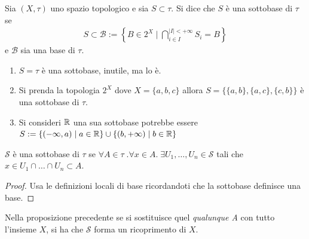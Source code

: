 \begin{definition}
	Sia $(X,\tau)$ uno spazio topologico e sia $S \subset \tau$. Si dice che $S$ è una sottobase di $\tau$ se 
	\begin{equation}
	\begin{aligned}
		S \subset \mathcal{B} := \left\{ B \in 2^X \; | \; \bigcap^{|I| < +\infty}_{i \in I} S_i = B \right\}
	\end{aligned}
	\end{equation}
	e $\mathcal{B}$ sia una base di $\tau$.
\end{definition}

\begin{example}
\begin{enumerate}
	\item $S = \tau$ è una sottobase, inutile, ma lo è.
	\item Si prenda la topologia $2^X$ dove $X = \{a,b,c\}$ allora $S = \{\{a,b\},\{a,c\},\{c,b\}\}$ è una sottobase di $\tau$.
	\item Si consideri $\mathbb{R}$ una sua sottobase potrebbe essere $S := \{(-\infty, a) \; | \; a \in \mathbb{R}\} \cup \{(b, +\infty) \; | \; b \in \mathbb{R}\}$
\end{enumerate}
\end{example}

\begin{proposition}
	$\mathcal{S}$ è una sottobase di $\tau$ se $\forall A \in \tau \; . \forall x \in A . \; \exists U_1, \dots, U_n \in \mathcal{S}$ tali che $x \in U_1 \cap \dots \cap U_n \subset A$. 
\end{proposition}
\begin{proof}
	Usa le definizioni locali di base ricordandoti che la sottobase definisce una base.
\end{proof}

\begin{remark}
	Nella proposizione precedente se si sostituisce quel \textit{qualunque A} con tutto l'insieme $X$, si ha che $\mathcal{S}$ forma un ricoprimento di $X$.
\end{remark}

